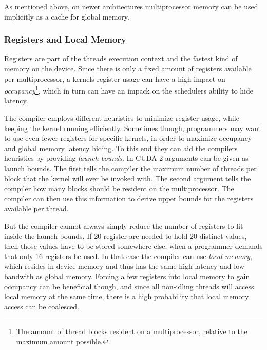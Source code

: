 
As mentioned above, on newer architectures multiprocessor memory can
be used implicitly as a cache for global memory.




\subsubsection{Registers and Local Memory}


Registers are part of the threads execution context and the fastest
kind of memory on the device. Since there is only a fixed amount of
registers available per multiprocessor, a kernels register usage can
have a high impact on \textit{occupancy}\footnote{The amount of thread
  blocks resident on a multiprocessor, relative to the maximum amount
  possible.}, which in turn can have an impack on the schedulers
ability to hide latency.


The compiler employs different heuristics to minimize register usage,
while keeping the kernel running efficiently. Sometimes though,
programmers may want to use even fewer registers for specific kernels,
in order to maximize occupancy and global memory latency hiding. To
this end they can aid the compilers heuristics by providing
\textit{launch bounds}. In CUDA 2 arguments can be given as launch
bounds. The first tells the compiler the maximum number of threads per
block that the kernel will ever be invoked with. The second argument
tells the compiler how many blocks should be resident on the
multiprocessor. The compiler can then use this information to derive
upper bounds for the registers available per thread.





But the compiler cannot always simply reduce the number of registers
to fit inside the launch bounds. If 20 register are needed to hold 20
distinct values, then those values have to be stored somewhere else,
when a programmer demands that only 16 registers be used. In that case
the compiler can use \textit{local memory}, which resides in device
memory and thus has the same high latency and low bandwith as global
memory. Forcing a few registers into local memory to gain occupancy
can be beneficial though, and since all non-idling threads will access
local memory at the same time, there is a high probability that local
memory access can be coalesced.

